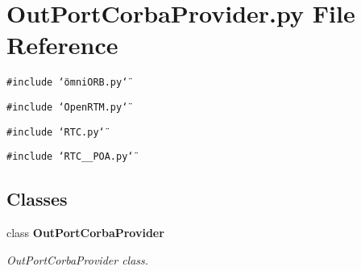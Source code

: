 \section{Out\-Port\-Corba\-Provider.py File Reference}
\label{OutPortCorbaProvider_8py}
{\tt \#include \char`\"{}omni\-ORB.py\char`\"{}}\par
{\tt \#include \char`\"{}Open\-RTM.py\char`\"{}}\par
{\tt \#include \char`\"{}RTC.py\char`\"{}}\par
{\tt \#include \char`\"{}RTC\_\-\_\-POA.py\char`\"{}}\par
\subsection*{Classes}
\begin{CompactItemize}
\item 
class {\bf Out\-Port\-Corba\-Provider}
\begin{CompactList}\small\item\em Out\-Port\-Corba\-Provider class. \item\end{CompactList}\end{CompactItemize}
